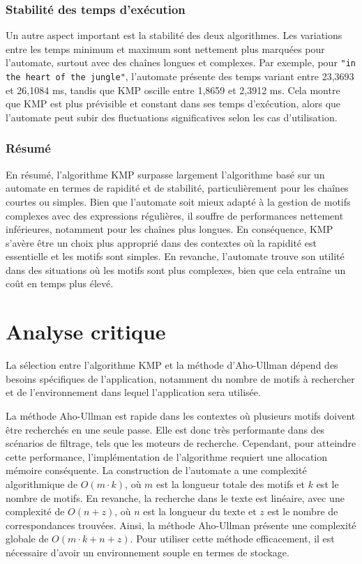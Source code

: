 \documentclass{article}
\begin{document}
\subsubsection*{Stabilité des temps d'exécution}
Un autre aspect important est la stabilité des deux algorithmes. Les variations entre les temps minimum et maximum sont nettement plus marquées pour l'automate, surtout avec des chaînes longues et complexes. Par exemple, pour \texttt{"in the heart of the jungle"}, l'automate présente des temps variant entre 23,3693 et 26,1084 ms, tandis que KMP oscille entre 1,8659 et 2,3912 ms. Cela montre que KMP est plus prévisible et constant dans ses temps d'exécution, alors que l'automate peut subir des fluctuations significatives selon les cas d'utilisation.

\subsubsection{Résumé}
En résumé, l'algorithme KMP surpasse largement l'algorithme basé sur un automate en termes de rapidité et de stabilité, particulièrement pour les chaînes courtes ou simples. Bien que l'automate soit mieux adapté à la gestion de motifs complexes avec des expressions régulières, il souffre de performances nettement inférieures, notamment pour les chaînes plus longues. En conséquence, KMP s'avère être un choix plus approprié dans des contextes où la rapidité est essentielle et les motifs sont simples. En revanche, l'automate trouve son utilité dans des situations où les motifs sont plus complexes, bien que cela entraîne un coût en temps plus élevé.


\newpage
\section{Analyse critique}
La sélection entre l'algorithme KMP et la méthode d’Aho-Ullman dépend des besoins spécifiques de l’application, notamment du nombre de motifs à rechercher et de l’environnement dans lequel l’application sera utilisée.

La méthode Aho-Ullman est rapide dans les contextes où plusieurs motifs doivent être recherchés en une seule passe. Elle est donc très performante dans des scénarios de filtrage, tels que les moteurs de recherche. Cependant, pour atteindre cette performance, l’implémentation de l’algorithme requiert une allocation mémoire conséquente. La construction de l’automate a une complexité algorithmique de \( O(m \cdot k) \), où \( m \) est la longueur totale des motifs et \( k \) est le nombre de motifs. En revanche, la recherche dans le texte est linéaire, avec une complexité de \( O(n + z) \), où \( n \) est la longueur du texte et \( z \) est le nombre de correspondances trouvées. Ainsi, la méthode Aho-Ullman présente une complexité globale de \( O(m \cdot k + n + z) \). Pour utiliser cette méthode efficacement, il est nécessaire d’avoir un environnement souple en termes de stockage.
\end{document}
